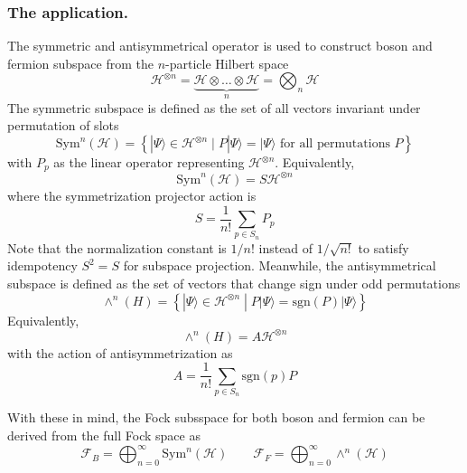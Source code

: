 \documentclass[../../../main.tex]{subfiles}
\begin{document}
\subsubsection{The application.}
The symmetric and antisymmetrical operator is used to construct boson and fermion subspace from the $n $-particle Hilbert space
\begin{equation*}
  \mathcal{H}^{\otimes n}  =
  \underbrace{\mathcal{H} \otimes \dots \otimes \mathcal{H}}_n =
  \bigotimes_n \mathcal{H}
\end{equation*}
The symmetric subspace is defined as the set of all vectors invariant under permutation of slots
\begin{equation*}
  \mathrm{Sym}^n(\mathcal{H}) = \left\{ |\Psi\rangle \in \mathcal{H}^{\otimes n} \mid P|\Psi\rangle = |\Psi\rangle \text{ for all permutations } P \right\}
\end{equation*}
with $P_p$ as the linear operator representing $\mathcal{H}^{\otimes n}$.
Equivalently,
\begin{equation*}
  \mathrm{Sym}^n(\mathcal{H}) = S\mathcal{H}^{\otimes n}
\end{equation*}
where the symmetrization projector action is
\begin{equation*}
  S = \frac{1}{n!} \sum_{p \in S_n} P_p
\end{equation*}
Note that the normalization constant is $1/n!$ instead of $1/\sqrt{n!}$ to satisfy idempotency $S^2=S$ for subspace projection.
Meanwhile, the antisymmetrical subspace is defined as the set of vectors that change sign under odd permutations
\begin{equation*}
  \wedge^n(H) = \left\{ |\Psi\rangle \in \mathcal{H}^{\otimes n} \;|\; P |\Psi\rangle = \mathrm{sgn}(P) |\Psi\rangle \right\}
\end{equation*}
Equivalently,
\begin{equation*}
  \wedge^n(H) = A \mathcal{H}^{\otimes n}
\end{equation*}
with the action of antisymmetrization as
\begin{equation*}
  A = \frac{1}{n!} \sum_{p \in S_n} \text{sgn}(p) P
\end{equation*}

With these in mind, the Fock subsspace for both boson and fermion can be derived from the full Fock space as
\begin{equation*}
  \mathcal{F}_B = \bigoplus_{n=0}^{\infty} \mathrm{Sym}^n(\mathcal{H}) \qquad
  \mathcal{F}_F = \bigoplus_{n=0}^{\infty} \wedge^n(\mathcal{H})
\end{equation*}
\end{document}
